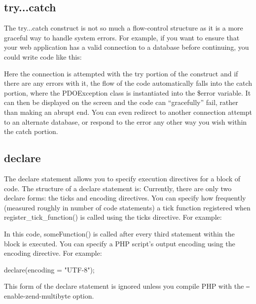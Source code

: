 \documentclass{report}
\begin{document}
\bigbreak \noindent 
\subsection{try...catch}
\bigbreak \noindent 
The try...catch construct is not so much a flow-control structure as it is a more graceful
way to handle system errors. For example, if you want to ensure that your web application has a valid connection to a database before continuing, you could write code
like this:
\bigbreak \noindent 
{}
\bigbreak \noindent 
Here the connection is attempted with the try portion of the construct and if there are
any errors with it, the flow of the code automatically falls into the catch portion, where
the PDOException class is instantiated into the \$error variable. It can then be displayed
on the screen and the code can “gracefully” fail, rather than making an abrupt end. You
can even redirect to another connection attempt to an alternate database, or respond
to the error any other way you wish within the catch portion.

\bigbreak \noindent 
\subsection{declare}
\bigbreak \noindent 
The declare statement allows you to specify execution directives for a block of code. The structure of a declare statement is:
\bigbreak \noindent 
Currently, there are only two declare forms: the ticks and encoding directives. You can
specify how frequently (measured roughly in number of code statements) a tick function registered when register\_tick\_function() is called using the ticks directive. For
example:
\bigbreak \noindent 
{}
\bigbreak \noindent 
In this code, someFunction() is called after every third statement within the block is executed.
\bigbreak \noindent 
You can specify a PHP script’s output encoding using the encoding directive. For example:
\bigbreak \noindent 
\begin{phpcode}
declare(encoding = "UTF-8");
\end{phpcode}
\bigbreak \noindent 
This form of the declare statement is ignored unless you compile PHP with the \texttt{--}enable-zend-multibyte option.
\end{document}

